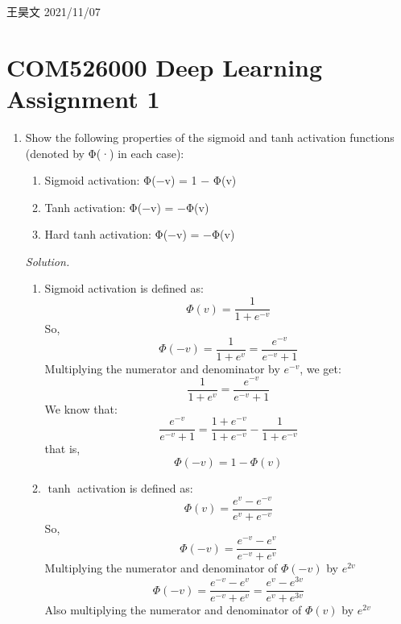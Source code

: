 \documentclass[12pt]{article}
\newcommand\sol[1] {
    \begin{mdframed}
        \emph{Solution.} #1
    \end{mdframed}
}
\begin{document}
 王昊文 \hfill  2021/11/07
\section*{COM526000 Deep Learning Assignment 1}
\begin{enumerate}[ref=\theenumi]
    \item Show the following properties of the sigmoid and tanh activation functions (denoted
            by Φ(·) in each case): 
        \begin{enumerate}
            \item Sigmoid activation: Φ(−v) = 1 − Φ(v)
            \item Tanh activation: Φ(−v) = −Φ(v)
            \item Hard tanh activation: Φ(−v) = −Φ(v)
        \end{enumerate}
        \sol{
            \begin{enumerate}
                \item Sigmoid activation is defined as:
                    \[
                        \Phi(v) = \frac{1}{1 + e^{-v}}
                    \]
                    So,
                    \[
                        \Phi(-v) = \frac{1}{1 + e^{v}}
                        = \frac{e^{-v}}{e^{-v} + 1}
                    \] 
                    Multiplying the numerator and denominator by $e^{-v}$, we get:
                    \[
                        \frac{1}{1 + e^{v}}
                        = \frac{e^{-v}}{e^{-v} + 1}
                    \] 
                    We know that:
                    \[
                        \frac{e^{-v}}{e^{-v} + 1}
                        = \frac{1 + e^{-v}}{1 + e^{-v}} - \frac{1}{1 + e^{-v}}
                    \]
                    that is,
                    \[
                        \Phi(-v)
                        = 1 - \Phi(v)
                    \]
                \item $\tanh$ activation is defined as:
                    \[
                        \Phi(v) = \frac{e^{v} - e^{-v}}{e^{v} + e^{-v}}
                    \]
                    So,
                    \[
                        \Phi(-v) = \frac{e^{-v} - e^{v}}{e^{-v} + e^{v}}
                    \] 
                    Multiplying the numerator and denominator of $\Phi(-v)$ by $e^{2v}$
                    \[
                        \Phi(-v) = \frac{e^{-v} - e^{v}}{e^{-v} + e^{v}}
                        = \frac{e^{v} - e^{3v}}{e^{v} + e^{3v}}
                    \] 
                    Also multiplying the numerator and denominator of $\Phi(v)$ by $e^{2v}$

\end{enumerate}}
\end{enumerate}
\end{document}
